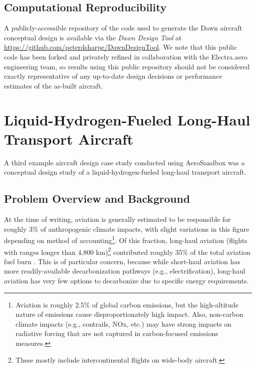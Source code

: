 \subsection{Computational Reproducibility}

A publicly-accessible repository of the code used to generate the Dawn aircraft conceptual design is available via the \emph{Dawn Design Tool} at \url{https://github.com/peterdsharpe/DawnDesignTool}. We note that this public code has been forked and privately refined in collaboration with the Electra.aero engineering team, so results using this public repository should not be considered exactly representative of any up-to-date design decisions or performance estimates of the as-built aircraft.


\section{Liquid-Hydrogen-Fueled Long-Haul Transport Aircraft}
\label{sec:hydrogen}

A third example aircraft design case study conducted using AeroSandbox was a conceptual design study of a liquid-hydrogen-fueled long-haul transport aircraft.

\subsection{Problem Overview and Background}

At the time of writing, aviation is generally estimated to be responsible for roughly 3\% of anthropogenic climate impacts, with slight variations in this figure depending on method of accounting\footnote{Aviation is roughly 2.5\% of global carbon emissions, but the high-altitude nature of emissions cause disproportionately high impact. Also, non-carbon climate impacts (e.g., contrails, NOx, etc.) may have strong impacts on radiative forcing that are not captured in carbon-focused emissions measures.}. Of this fraction, long-haul aviation (flights with ranges longer than 4,800 km)\footnote{These mostly include intercontinental flights on wide-body aircraft.} contributed roughly 35\% of the total aviation fuel burn \cite{yutko}. This is of particular concern, because while short-haul aviation has more readily-available decarbonization pathways (e.g., electrification), long-haul aviation has very few options to decarbonize due to specific energy requirements.

